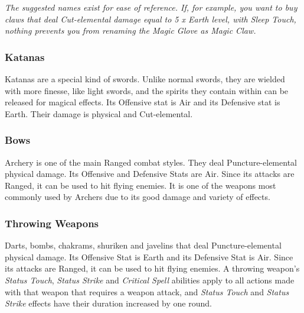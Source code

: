 \begin{tabwpn}[label=inv-claws,range=melee,type=physical,element=crush / cut,roll=earthvair]
    
\end{tabwpn}
{\footnotesize\textit{The suggested names exist for ease of reference. If, for example, you want to buy claws that deal Cut-elemental damage equal to 5 x Earth level, with Sleep Touch, nothing prevents you from renaming the Magic Glove as Magic Claw.}}
\clearpage

\subsubsection{Katanas}

Katanas are a special kind of swords. Unlike normal swords, they are wielded with more finesse, like light swords, and the spirits they contain within can be released for magical effects. Its Offensive stat is Air and its Defensive stat is Earth. Their damage is physical and Cut-elemental.

\begin{tabwpn}[label=inv-katanas,range=melee,type=physical,element=cut,roll=airvsearth]
    
\end{tabwpn}
\clearpage

\subsubsection{Bows}

Archery is one of the main Ranged combat styles. They deal Puncture-elemental physical damage. Its Offensive and Defensive Stats are Air. Since its attacks are Ranged, it can be used to hit flying enemies. It is one of the weapons most commonly used by Archers due to its good damage and variety of effects.

\begin{tabwpn}[label=inv-bows,range=ranged,type=physical,element=puncture,roll=airvair]
    
\end{tabwpn}
\clearpage

\subsubsection{Throwing Weapons}

Darts, bombs, chakrams, shuriken and javelins that deal Puncture-elemental physical damage. Its Offensive Stat is Earth and its Defensive Stat is Air. Since its attacks are Ranged, it can be used to hit flying enemies. A throwing weapon's \textit{Status Touch}, \textit{Status Strike} and \textit{Critical Spell} abilities apply to all actions made with that weapon that requires a weapon attack, and \textit{Status Touch} and \textit{Status Strike} effects have their duration increased by one round.

